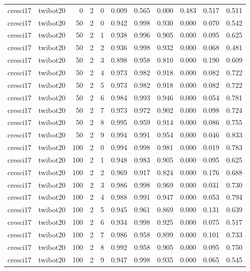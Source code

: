 \begin{tabular}{llrrrrrrrrr}
cresci17 & twibot20 & 0 & 2 & 0 & 0.009 & 0.565 & 0.000 & 0.483 & 0.517 & 0.511 \\
cresci17 & twibot20 & 50 & 2 & 0 & 0.942 & 0.998 & 0.930 & 0.000 & 0.070 & 0.542 \\
cresci17 & twibot20 & 50 & 2 & 1 & 0.938 & 0.996 & 0.905 & 0.000 & 0.095 & 0.625 \\
cresci17 & twibot20 & 50 & 2 & 2 & 0.936 & 0.998 & 0.932 & 0.000 & 0.068 & 0.481 \\
cresci17 & twibot20 & 50 & 2 & 3 & 0.898 & 0.958 & 0.810 & 0.000 & 0.190 & 0.609 \\
cresci17 & twibot20 & 50 & 2 & 4 & 0.973 & 0.982 & 0.918 & 0.000 & 0.082 & 0.722 \\
cresci17 & twibot20 & 50 & 2 & 5 & 0.973 & 0.982 & 0.918 & 0.000 & 0.082 & 0.722 \\
cresci17 & twibot20 & 50 & 2 & 6 & 0.984 & 0.993 & 0.946 & 0.000 & 0.054 & 0.781 \\
cresci17 & twibot20 & 50 & 2 & 7 & 0.973 & 0.972 & 0.902 & 0.000 & 0.098 & 0.724 \\
cresci17 & twibot20 & 50 & 2 & 8 & 0.995 & 0.959 & 0.914 & 0.000 & 0.086 & 0.755 \\
cresci17 & twibot20 & 50 & 2 & 9 & 0.994 & 0.991 & 0.954 & 0.000 & 0.046 & 0.833 \\
cresci17 & twibot20 & 100 & 2 & 0 & 0.994 & 0.998 & 0.981 & 0.000 & 0.019 & 0.783 \\
cresci17 & twibot20 & 100 & 2 & 1 & 0.948 & 0.983 & 0.905 & 0.000 & 0.095 & 0.625 \\
cresci17 & twibot20 & 100 & 2 & 2 & 0.969 & 0.917 & 0.824 & 0.000 & 0.176 & 0.688 \\
cresci17 & twibot20 & 100 & 2 & 3 & 0.986 & 0.998 & 0.969 & 0.000 & 0.031 & 0.730 \\
cresci17 & twibot20 & 100 & 2 & 4 & 0.988 & 0.991 & 0.947 & 0.000 & 0.053 & 0.794 \\
cresci17 & twibot20 & 100 & 2 & 5 & 0.945 & 0.961 & 0.869 & 0.000 & 0.131 & 0.639 \\
cresci17 & twibot20 & 100 & 2 & 6 & 0.934 & 0.998 & 0.925 & 0.000 & 0.075 & 0.517 \\
cresci17 & twibot20 & 100 & 2 & 7 & 0.986 & 0.958 & 0.899 & 0.000 & 0.101 & 0.733 \\
cresci17 & twibot20 & 100 & 2 & 8 & 0.992 & 0.958 & 0.905 & 0.000 & 0.095 & 0.750 \\
cresci17 & twibot20 & 100 & 2 & 9 & 0.947 & 0.998 & 0.935 & 0.000 & 0.065 & 0.545 \\

\end{tabular}
